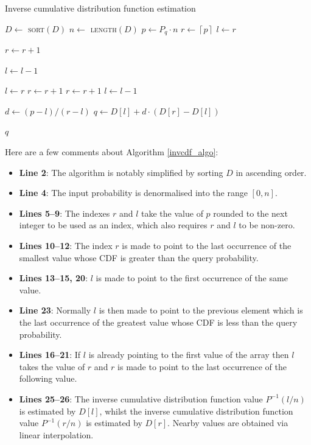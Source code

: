 \documentclass[10pt,final]{siamltex}
\begin{document}
\begin{algorithm}
  \caption{Inverse cumulative distribution function estimation}
  \label{invcdf_algo}
  \begin{algorithmic}[1]
    \State $D \gets$ \textsc{sort}$(D)$
    \State $n \gets$ \textsc{length}$(D)$
    \State $p \gets P_q \cdot n$
    \State $r \gets  \left \lceil{p}\right \rceil$
    \EndIf
    \State $l \gets r$

    \State $ r \gets r + 1$
    \EndWhile

    \State $l \gets l - 1$
    \EndWhile

    \State $l \gets r$
    \State $r \gets r+1$
    \State $r \gets r + 1$
    \EndWhile
    \Else
    \State $ l \gets l - 1$
    \EndIf

    \State $d \gets (p-l)/(r-l) $
    \State $q \gets D[l] + d \cdot (D[r]-D[l])$

    \State \Return $q$
    \EndFunction
  \end{algorithmic}
\end{algorithm}

Here are a few comments about Algorithm \ref{invcdf_algo}:
\begin{itemize}
  \item \textbf{Line 2}: The algorithm is notably simplified by sorting $D$ in ascending order.
  \item \textbf{Line 4}: The input probability is denormalised into the range $[0, n]$.
  \item \textbf{Lines 5--9}: The indexes $r$ and $l$ take the value of $p$ rounded to the next integer to be used as an index, which also requires $r$ and $l$ to be non-zero.
  \item \textbf{Lines 10--12}: The index $r$ is made to point to the last occurrence of the smallest value whose CDF is greater than the query probability.
  \item \textbf{Lines 13--15, 20}: $l$ is made to point to the first occurrence of the same value.
  \item \textbf{Line 23}: Normally $l$ is then made to point to the previous element which is the last occurrence of the greatest value whose CDF is less than the query probability.
  \item \textbf{Lines 16--21}: If $l$ is already pointing to the first value of the array then $l$ takes the value of $r$ and $r$ is made to point to the last occurrence of the following value.
  \item \textbf{Lines 25--26}: The inverse cumulative distribution function value $P^{-1}(l/n)$ is estimated by $D[l]$, whilst the inverse cumulative distribution function value $P^{-1}(r/n)$ is estimated by $D[r]$. Nearby values are obtained via linear interpolation.
\end{itemize}
%
\end{document}
